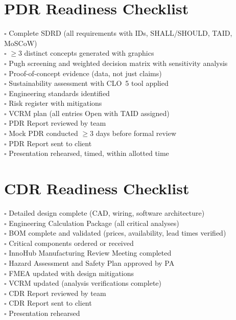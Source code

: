 \section*{PDR Readiness Checklist}
$\square$ Complete SDRD (all requirements with IDs, SHALL/SHOULD, TAID, MoSCoW) \\
$\square$ $\geq$3 distinct concepts generated with graphics \\
$\square$ Pugh screening and weighted decision matrix with sensitivity analysis \\
$\square$ Proof-of-concept evidence (data, not just claims) \\
$\square$ Sustainability assessment with CLO~5 tool applied \\
$\square$ Engineering standards identified \\
$\square$ Risk register with mitigations \\
$\square$ VCRM plan (all entries Open with TAID assigned) \\
$\square$ PDR Report reviewed by team \\
$\square$ Mock PDR conducted $\geq$3 days before formal review \\
$\square$ PDR Report sent to client \\
$\square$ Presentation rehearsed, timed, within allotted time

\section*{CDR Readiness Checklist}
$\square$ Detailed design complete (CAD, wiring, software architecture) \\
$\square$ Engineering Calculation Package (all critical analyses) \\
$\square$ BOM complete and validated (prices, availability, lead times verified) \\
$\square$ Critical components ordered or received \\
$\square$ InnoHub Manufacturing Review Meeting completed \\
$\square$ Hazard Assessment and Safety Plan approved by PA \\
$\square$ FMEA updated with design mitigations \\
$\square$ VCRM updated (analysis verifications complete) \\
$\square$ CDR Report reviewed by team \\
$\square$ CDR Report sent to client \\
$\square$ Presentation rehearsed

